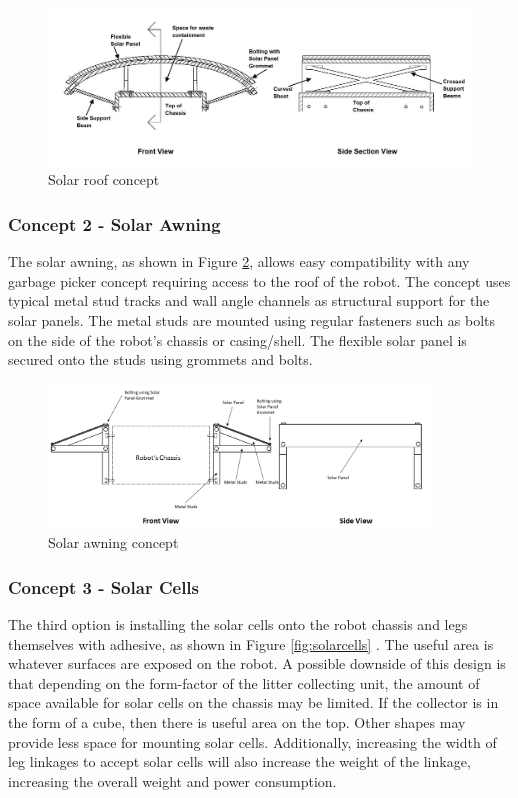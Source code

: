 \begin{figure}[H]
    \centering
    \includegraphics[width=\textwidth]{3_DesignConcepts/img/Solar/solar_roof.JPG}
    \caption{Solar roof concept}
    \label{fig:solar_roof}
\end{figure}

\subsubsection{Concept 2 - Solar Awning}

The solar awning, as shown in Figure \ref{fig:solar_sidePanel}, allows easy compatibility with any garbage picker concept requiring access to the roof of the robot. The concept uses typical metal stud tracks and wall angle channels as structural support for the solar panels. The metal studs are mounted using regular fasteners such as bolts on the side of the robot's chassis or casing/shell. The flexible solar panel is secured onto the studs using grommets and bolts.

\begin{figure}[H]
    \centering
    \includegraphics[width=0.9\textwidth]{img/Solar/SolarSidePanel.png}
    \caption{Solar awning concept}
    \label{fig:solar_sidePanel}
\end{figure}


\subsubsection{Concept 3 - Solar Cells}

The third option is installing the solar cells onto the robot chassis and legs themselves with adhesive, as shown in Figure \ref{fig:solarcells} \cite{gioco_solutions_installation_2018} \cite{3m_3m_nodate}. The useful area is whatever surfaces are exposed on the robot.
A possible downside of this design is that depending on the form-factor of the litter collecting unit, the amount of space available for solar cells on the chassis may be limited.
If the collector is in the form of a cube, then there is useful area on the top.
Other shapes may provide less space for mounting solar cells.
Additionally, increasing the width of leg linkages to accept solar cells will also increase the weight of the linkage, increasing the overall weight and power consumption.

